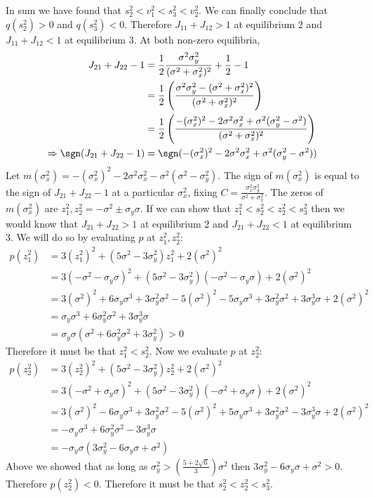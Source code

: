 \documentclass{article}
\begin{document}
\begin{enumerate}
In sum we have found that $s_2^2<v_1^2<s_3^2<v_2^2$. We can finally conclude that $q(s_2^2)> 0$ and $q(s_3^2)< 0$. Therefore $J_{11}+J_{12}> 1$ at equilibrium $2$ and $J_{11}+J_{12}< 1$ at equilibrium $3$. At both non-zero equilibria,
\begin{align*}
J_{21}+J_{22}-1&=\frac{1}{2}\frac{\sigma^2\sigma_y^2}{(\sigma^2+\sigma_x^2)^2}+\frac{1}{2}-1
\\&=\frac{1}{2}\left(\frac{\sigma^2\sigma_y^2-(\sigma^2+\sigma_x^2)^2}{(\sigma^2+\sigma_x^2)^2}\right)
\\&=\frac{1}{2}\left(\frac{-(\sigma_x^2)^2-2\sigma^2\sigma_x^2+\sigma^2(\sigma_y^2-\sigma^2)}{(\sigma^2+\sigma_x^2)^2}\right)
\\ \Rightarrow \sgn(J_{21}+J_{22}-1)&=\sgn(-(\sigma_x^2)^2-2\sigma^2\sigma_x^2+\sigma^2(\sigma_y^2-\sigma^2))
\end{align*}
Let $m(\sigma_x^2)=-(\sigma_x^2)^2-2\sigma^2\sigma_x^2-\sigma^2(\sigma^2-\sigma_y^2)$. The sign of $m(\sigma_x^2)$ is equal to the sign of $J_{21}+J_{22}-1$ at a particular $\sigma_x^2$, fixing $C=\frac{\sigma_x^2\sigma_y^2}{\sigma^2+\sigma_x^2}$. The zeros of $m(\sigma_x^2)$ are $z_1^2,z_2^2=-\sigma^2\pm\sigma_y\sigma$. If we can show that $z_1^2<s_2^2<z_2^2<s_3^2$ then we would know that $J_{21}+J_{22}>1$ at equilibrium $2$ and $J_{21}+J_{22}<1$ at equilibrium $3$. We will do so by evaluating $p$ at $z_1^2,z_2^2$:
\begin{align*}
p(z_1^2)&=3(z_1^2)^2+(5\sigma^2-3\sigma_y^2)z_1^2+2(\sigma^2)^2
\\&=3(-\sigma^2-\sigma_y\sigma)^2+(5\sigma^2-3\sigma_y^2)(-\sigma^2-\sigma_y\sigma)+2(\sigma^2)^2
\\&=3(\sigma^2)^2+6\sigma_y\sigma^3+3\sigma_y^2\sigma^2-5(\sigma^2)^2-5\sigma_y\sigma^3+3\sigma_y^2\sigma^2+3\sigma_y^3\sigma+2(\sigma^2)^2
\\&=\sigma_y\sigma^3+6\sigma_y^2\sigma^2+3\sigma_y^3\sigma
\\&=\sigma_y\sigma(\sigma^2+6\sigma_y^2\sigma^2+3\sigma_y^2)>0
\end{align*}
Therefore it must be that $z_1^2<s_2^2$. Now we evaluate $p$ at $z_2^2$:
\begin{align*}
p(z_2^2)&=3(z_2^2)^2+(5\sigma^2-3\sigma_y^2)z_2^2+2(\sigma^2)^2
\\&=3(-\sigma^2+\sigma_y\sigma)^2+(5\sigma^2-3\sigma_y^2)(-\sigma^2+\sigma_y\sigma)+2(\sigma^2)^2
\\&=3(\sigma^2)^2-6\sigma_y\sigma^3+3\sigma_y^2\sigma^2-5(\sigma^2)^2+5\sigma_y\sigma^3+3\sigma_y^2\sigma^2-3\sigma_y^3\sigma+2(\sigma^2)^2
\\&=-\sigma_y\sigma^3+6\sigma_y^2\sigma^2-3\sigma_y^3\sigma
\\&=-\sigma_y\sigma(3\sigma_y^2-6\sigma_y\sigma+\sigma^2)
\end{align*}
Above we showed that as long as $\sigma_y^2>\left(\frac{5+2\sqrt{6}}{3}\right)\sigma^2$ then $3\sigma_y^2-6\sigma_y\sigma+\sigma^2>0$. Therefore $p(z_2^2)<0$. Therefore it must be that $s_2^2<z_2^2<s_3^2$. 


\end{enumerate}
\end{document}
